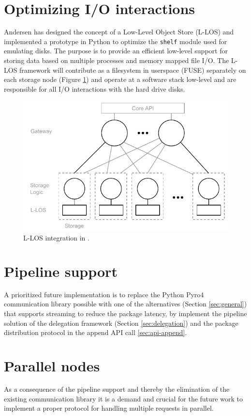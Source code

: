 \section{Optimizing I/O interactions}
Andersen has designed the concept of a Low-Level Object Store (L-LOS) and implemented a prototype in Python\cite{andersen2016} to optimize the \texttt{shelf} module used for emulating disks. The purpose is to provide an efficient low-level support for storing data based on multiple processes and memory mapped file I/O. The L-LOS framework will contribute as a filesystem in userspace (FUSE) separately on each storage node (Figure \ref{fig:sofa-llos-extension}) and operate at a software stack low-level and are responsible for all I/O interactions with the hard drive disks.

\begin{figure}
	\centering
	\includegraphics[scale=0.95]{pdf/sofa-llos-extension.pdf}
	\caption{L-LOS integration in \CodeName. \label{fig:sofa-llos-extension}}
\end{figure}

\section{Pipeline support}
A prioritized future implementation is to replace the Python Pyro4 communication library possible with one of the alternatives (Section \ref{sec:general}) that supports streaming to reduce the package latency, by implement the pipeline solution of the delegation framework (Section \ref{sec:delegation}) and the package distribution protocol in the append API call \ref{sec:api-append}.

\section{Parallel nodes} \label{sec:parallel}
As a consequence of the pipeline support and thereby the elimination of the existing communication library it is a demand and crucial for the future work to implement a proper protocol for handling multiple requests in parallel.

